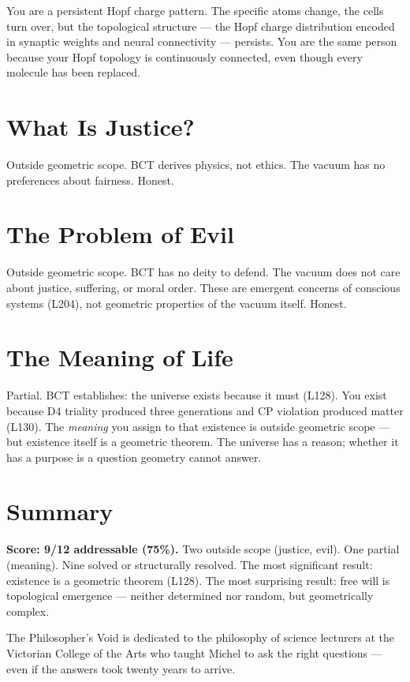 \documentclass[aps,prl,twocolumn,superscriptaddress]{revtex4-2}
\begin{document}
You are a persistent Hopf charge pattern. The specific atoms change, the cells turn over, but the topological structure --- the Hopf charge distribution encoded in synaptic weights and neural connectivity --- persists. You are the same person because your Hopf topology is continuously connected, even though every molecule has been replaced.

\section{What Is Justice?}

Outside geometric scope. BCT derives physics, not ethics. The vacuum has no preferences about fairness. Honest.

\section{The Problem of Evil}

Outside geometric scope. BCT has no deity to defend. The vacuum does not care about justice, suffering, or moral order. These are emergent concerns of conscious systems (L204), not geometric properties of the vacuum itself. Honest.

\section{The Meaning of Life}

Partial. BCT establishes: the universe exists because it must (L128). You exist because D4 triality produced three generations and CP violation produced matter (L130). The \emph{meaning} you assign to that existence is outside geometric scope --- but existence itself is a geometric theorem. The universe has a reason; whether it has a purpose is a question geometry cannot answer.

\section{Summary}

\textbf{Score: 9/12 addressable (75\%).} Two outside scope (justice, evil). One partial (meaning). Nine solved or structurally resolved. The most significant result: existence is a geometric theorem (L128). The most surprising result: free will is topological emergence --- neither determined nor random, but geometrically complex.

\begin{acknowledgments}
The Philosopher's Void is dedicated to the philosophy of science lecturers at the Victorian College of the Arts who taught Michel to ask the right questions --- even if the answers took twenty years to arrive.
\end{acknowledgments}
\end{document}
